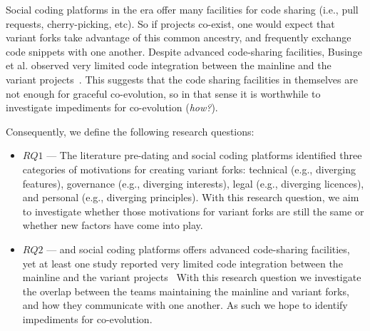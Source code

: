 Social coding platforms in the \gh era offer many facilities for code sharing (i.e., pull requests, cherry-picking, etc).
So if projects co-exist, one would expect that variant forks take advantage of this common ancestry, and frequently exchange code snippets with one another.
Despite advanced code-sharing facilities, Businge et al. observed very limited code integration between the mainline and the variant projects~\cite{businge:emse:2021}.
This suggests that the code sharing facilities in themselves are not enough for graceful co-evolution, so in that sense it is worthwhile to investigate impediments for co-evolution (\textit{how?}).


\newcommand*{\RQOne} [1] {Why do developers create and maintain variants on \gh?}
\newcommand*{\RQTwo} [1] {How do variant projects evolve with respect to the mainline?}


\noindent
Consequently, we define the following research questions:
\begin{itemize}
\item $RQ1$ --- \textit{\RQOne}
The literature pre-dating \git and social coding platforms identified three categories of motivations for creating variant forks: technical (e.g., diverging features), governance (e.g., diverging interests), legal (e.g., diverging licences), and personal (e.g., diverging principles).
With this research question, we aim to investigate whether those motivations for variant forks are still the same or whether new factors have come into play. 

\item $RQ2$ --- \textit{\RQTwo}
\git and social coding platforms offers advanced code-sharing facilities, yet at least one study reported very limited code integration between the mainline and the variant projects~\cite{businge:emse:2021}
With this research question we investigate the overlap between the teams maintaining the mainline and variant forks, and how they communicate with one another.
As such we hope to identify impediments for co-evolution.
\end{itemize}


